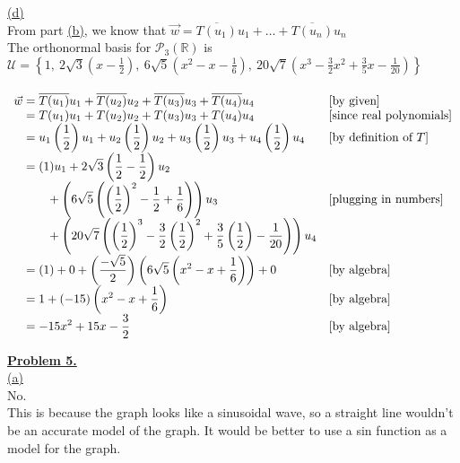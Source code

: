 \documentclass[12pt]{article}
\newcommand{\R}{\mathbb{R}}
\begin{document}
\hyperlink{toc}{\hypertarget{4.4}{(d)}}\\
From part \hyperlink{4.2}{(b)}, we know that $\vec{w} = \overline{T(u_1)}u_1 + \ldots + \overline{T(u_n)}u_n$\\
The orthonormal basis for $\mathcal{P}_3(\R)$ is \\
$\mathcal{U} =\displaystyle \left\{ 1, \ 2\sqrt{3}\left(x-\frac{1}{2}\right), \ 6 \sqrt{5}\left(x^2-x-\frac{1}{6}\right), \ 20\sqrt{7}\left(x^3-\frac{3}{2}x^2+\frac{3}{5}x-\frac{1}{20}\right) \right\}$
\\\\
{$\begin{array}{r@{}>{\displaystyle}ll}
	 \vec{w} & {}= \overline{T(u_1)}u_1 + \overline{T(u_2)}u_2 + \overline{T(u_3)}u_3  + \overline{T(u_4)}u_4 & [\text{by given}]\\
	 & {}= {T(u_1)}u_1 + {T(u_2)}u_2 + {T(u_3)}u_3  + {T(u_4)}u_4 & [\text{since real polynomials}]\\
	 & {}= u_1\left(\frac{1}{2}\right)u_1 + u_2\left(\frac{1}{2}\right)u_2 +u_3\left(\frac{1}{2}\right)u_3 +u_4\left(\frac{1}{2}\right)u_4  & [\text{by definition of } T]\\
	 & {}= (1)u_1 + 2\sqrt{3}\left(\frac{1}{2}-\frac{1}{2}\right)u_2 &\\
	 &{} \qquad +
	 \left(6 \sqrt{5}\left(\left(\frac{1}{2}\right)^2-\frac{1}{2}+\frac{1}{6}\right)\right)u_3 & [\text{plugging in numbers}]\\ 
	 &{}\qquad + 
	 \left(20\sqrt{7}\left(\left(\frac{1}{2}\right)^3-\frac{3}{2}\left(\frac{1}{2}\right)^2+\frac{3}{5}\left(\frac{1}{2}\right)-\frac{1}{20}\right)\right)u_4  & \text{}\\

	 & {}=(1) + 0 + \left(\frac{-\sqrt{5}}{2}\right)\left(6 \sqrt{5}\left(x^2-x+\frac{1}{6}\right)\right) + 0 & [\text{by algebra}]\\
	 & {}=1 + \left(-15\right)\left(x^2-x+\frac{1}{6}\right) & [\text{by algebra}]\\
	 & {}= -15x^2+15x-\frac{3}{2} & [\text{by algebra}]\\

\end{array}$}

\newpage
{\LARGE \noindent \underline{\textbf{Problem 5.}}}\\

\hyperlink{toc}{\hypertarget{5.1}{(a)}}\\
No.\\
This is because the graph looks like a sinusoidal wave, so a straight line wouldn't be an accurate model of the graph. It would be better to use a sin function as a model for the graph.
\\\\\\
\end{document}
